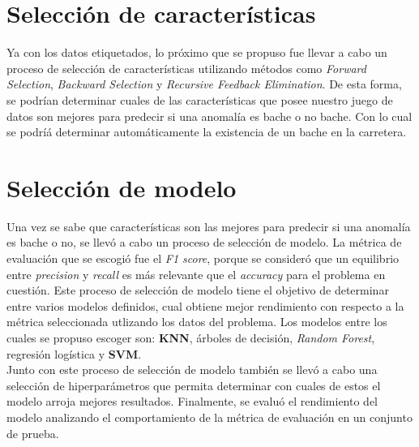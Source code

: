 \section{Selección de características}
	Ya con los datos etiquetados, lo próximo que se propuso fue llevar a cabo un proceso de selección de características utilizando métodos como
	\emph{Forward Selection}, \emph{Backward Selection} y \emph{Recursive Feedback Elimination}. De esta forma, se podrían determinar cuales de las 
	características que posee nuestro juego de datos son mejores para predecir si una anomalía es bache o no bache. Con lo cual se podríá determinar
	automáticamente la existencia de un bache en la carretera.

\section{Selección de modelo}
	Una vez se sabe que características son las mejores para predecir si una anomalía es bache o no, se llevó a cabo un proceso de selección de
	modelo. La métrica de evaluación que se escogió fue el \emph{F1 score}, porque se consideró que un equilibrio entre \emph{precision} y
	\emph{recall} es más relevante que el \emph{accuracy} para el problema en cuestión. Este proceso de selección de modelo tiene el
	objetivo de determinar entre varios modelos definidos, cual obtiene mejor rendimiento con respecto a la métrica seleccionada utlizando los datos
	del problema. Los modelos entre los cuales se propuso escoger son: \textbf{KNN}, árboles de decisión, \emph{Random Forest}, regresión logística y
	\textbf{SVM}.\\
	\indent Junto con este proceso de selección de modelo también se llevó a cabo una selección de hiperparámetros que permita determinar con
	cuales de estos el modelo arroja mejores resultados. Finalmente, se evaluó el rendimiento del modelo analizando el comportamiento de la métrica
	de evaluación en un conjunto de prueba.
